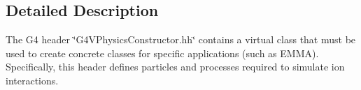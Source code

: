 \subsection{Detailed Description}
The G4 header \char`\"{}\-G4\-V\-Physics\-Constructor.\-hh\char`\"{} contains a virtual class that must be used to create concrete classes for specific applications (such as E\-M\-M\-A). Specifically, this header defines particles and processes required to simulate ion interactions. 